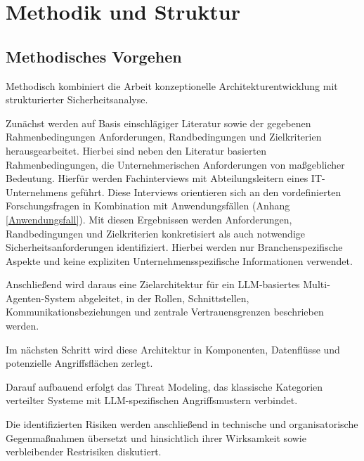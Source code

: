 %

\section{Methodik und Struktur}

\subsection{Methodisches Vorgehen}

Methodisch kombiniert die Arbeit konzeptionelle Architekturentwicklung mit strukturierter Sicherheitsanalyse.

Zunächst werden auf Basis einschlägiger Literatur sowie der gegebenen Rahmenbedingungen Anforderungen, Randbedingungen und Zielkriterien herausgearbeitet. \cite{georgeff_communication_1983,jennings_commitments_1993,jennings_roadmap_1998,russell_artificial_2022,sycara_distributed_1996,wang_large_2026} Hierbei sind neben den Literatur basierten Rahmenbedingungen, die Unternehmerischen Anforderungen von maßgeblicher Bedeutung. Hierfür werden Fachinterviews mit Abteilungsleitern eines IT-Unternehmens geführt. Diese Interviews orientieren sich an den vordefinierten Forschungsfragen in Kombination mit Anwendungsfällen (Anhang \ref{Anwendungsfall}). Mit diesen Ergebnissen werden Anforderungen, Randbedingungen und Zielkriterien konkretisiert als auch notwendige Sicherheitsanforderungen identifiziert. Hierbei werden nur Branchenspezifische Aspekte und keine expliziten Unternehmensspezifische Informationen verwendet.

Anschließend wird daraus eine Zielarchitektur für ein LLM-basiertes Multi-Agenten-System abgeleitet, in der Rollen, Schnittstellen, Kommunikationsbeziehungen und zentrale Vertrauensgrenzen beschrieben werden.

Im nächsten Schritt wird diese Architektur in Komponenten, Datenflüsse und potenzielle Angriffsflächen zerlegt.

Darauf aufbauend erfolgt das Threat Modeling, das klassische Kategorien verteilter Systeme mit LLM-spezifischen Angriffsmustern verbindet. \cite{wong_adding_2000,tete_threat_2024,krawiecka_extending_2025,noauthor_threat_2026,editor_owasp_nodate}

Die identifizierten Risiken werden anschließend in technische und organisatorische Gegenmaßnahmen übersetzt und hinsichtlich ihrer Wirksamkeit sowie verbleibender Restrisiken diskutiert. \cite{krawiecka_extending_2025,wong_adding_2000,editor_owasp_nodate,shostack2014threat,ferrag_prompt_2026,raza_trism_2026}

